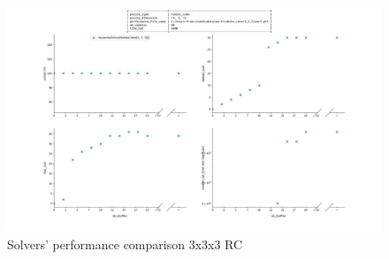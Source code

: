 \begin{landscape}
\centering\vspace*{\fill}
\begin{figure}[H]
\centering
\includegraphics[scale=0.50]{./Figures/333RCPerformance.jpeg}
\caption[333RCPerformance]{Solvers' performance comparison 3x3x3 RC}
\label{fig:333RCPerformance}
\end{figure}
\vfill
\end{landscape}
\restoregeometry


